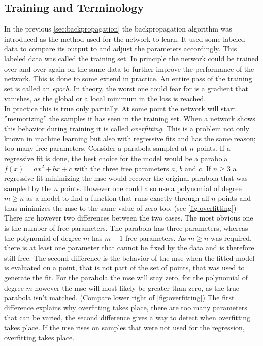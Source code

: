 \subsection{Training and Terminology}\label{sec:training}
In the previous \autoref{sec:backpropagation} the backpropagation algorithm was introduced as the method used for the network to learn. It used some labeled data to compare its output to and adjust the parameters accordingly. This labeled data was called the training set. In principle the network could be trained over and over again on the same data to further improve the performance of the network. This is done to some extend in practice. An entire pass of the training set is called an \emph{epoch}. In theory, the worst one could fear for is a gradient that vanishes, as the global or a local minimum in the loss is reached.\\
In practice this is true only partially. At some point the network will start ''memorizing'' the samples it has seen in the training set. When a network shows this behavior during training it is called \emph{overfitting}. This is a problem not only known in machine learning but also with regressive fits and has the same reason; too many free parameters. Consider a parabola sampled at $n$ points. If a regressive fit is done, the best choice for the model would be a parabola $f(x)=a x^2+b x + c$ with the three free parameters $a$, $b$ and $c$. If $n\geq 3$ a regressive fit minimizing the \gls{mse} would recover the original parabola that was sampled by the $n$ points. However one could also use a polynomial of degree $m\geq n$ as a model to find a function that runs exactly through all $n$ points and thus minimizes the \gls{mse} to the same value of zero too. (see \autoref{fig:overfitting})\\
There are however two differences between the two cases. The most obvious one is the number of free parameters. The parabola has three parameters, whereas the polynomial of degree $m$ has $m+1$ free parameters. As $m\geq n$ was required, there is at least one parameter that cannot be fixed by the data and is therefore still free. The second difference is the behavior of the \gls{mse} when the fitted model is evaluated on a point, that is not part of the set of points, that was used to generate the fit. For the parabola the \gls{mse} will stay zero, for the polynomial of degree $m$ however the \gls{mse} will most likely be greater than zero, as the true parabola isn't matched. (Compare lower right of \autoref{fig:overfitting}) The first difference explains why overfitting takes place, there are too many parameters that can be varied, the second difference gives a way to detect when overfitting takes place. If the \gls{mse} rises on samples that were not used for the regression, overfitting takes place.\\
